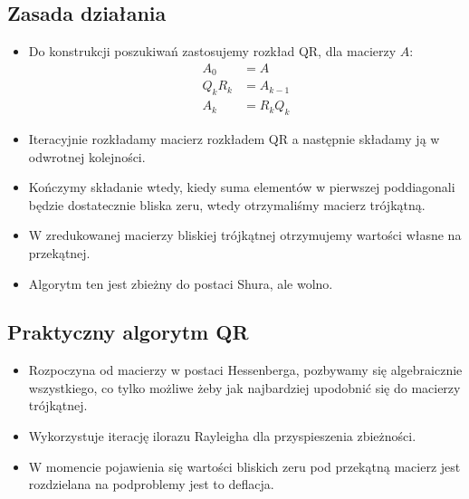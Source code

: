 \documentclass[a4paper]{article}
\begin{document}
\subsection{Zasada działania}
\begin{itemize}
    \item Do konstrukcji poszukiwań zastosujemy rozkład QR, dla macierzy $A$:
    \begin{equation*}
        \begin{split}
            A_0 & = A \\
            Q_k R_k & = A_{k-1} \\
            A_k & = R_k Q_k
        \end{split}
    \end{equation*}
    \item Iteracyjnie rozkładamy macierz rozkładem QR a następnie składamy ją w odwrotnej kolejności.
    \item Kończymy składanie wtedy, kiedy suma elementów w pierwszej poddiagonali będzie dostatecznie bliska zeru, wtedy otrzymaliśmy macierz trójkątną.
    \item W zredukowanej macierzy bliskiej trójkątnej otrzymujemy wartości własne na przekątnej.
    \item Algorytm ten jest zbieżny do postaci Shura, ale wolno.
\end{itemize}

\subsection{Praktyczny algorytm QR}
\begin{itemize}
    \item Rozpoczyna od macierzy w postaci Hessenberga, pozbywamy się algebraicznie wszystkiego, co tylko możliwe żeby jak najbardziej upodobnić się do macierzy trójkątnej.
    \item Wykorzystuje iterację ilorazu Rayleigha dla przyspieszenia zbieżności.
    \item W momencie pojawienia się wartości bliskich zeru pod przekątną macierz jest rozdzielana na podproblemy jest to deflacja.
\end{itemize}
\end{document}

